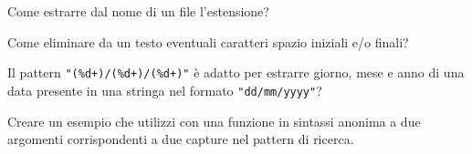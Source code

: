 \begin{Exercise}[label=libstd-04]
Come estrarre dal nome di un file l'estensione?
\end{Exercise}

\begin{Exercise}[label=libstd-05]
Come eliminare da un testo eventuali caratteri spazio iniziali e/o finali?
\end{Exercise}

\begin{Exercise}[label=libstd-06]
Il pattern \verb|"(%d+)/(%d+)/(%d+)"| è adatto per estrarre giorno, mese e
anno di una data presente in una stringa nel formato \verb|"dd/mm/yyyy"|?
\end{Exercise}

\begin{Exercise}[label=libstd-07]
Creare un esempio che utilizzi  con una funzione in sintassi
anonima a due argomenti corrispondenti a due capture nel pattern di ricerca.
\end{Exercise}


